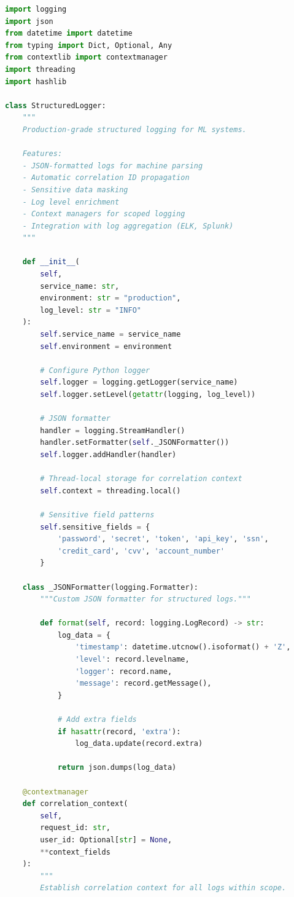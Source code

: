 \begin{lstlisting}[language=Python, caption={Production StructuredLogger with Metadata Enrichment}]
import logging
import json
from datetime import datetime
from typing import Dict, Optional, Any
from contextlib import contextmanager
import threading
import hashlib

class StructuredLogger:
    """
    Production-grade structured logging for ML systems.

    Features:
    - JSON-formatted logs for machine parsing
    - Automatic correlation ID propagation
    - Sensitive data masking
    - Log level enrichment
    - Context managers for scoped logging
    - Integration with log aggregation (ELK, Splunk)
    """

    def __init__(
        self,
        service_name: str,
        environment: str = "production",
        log_level: str = "INFO"
    ):
        self.service_name = service_name
        self.environment = environment

        # Configure Python logger
        self.logger = logging.getLogger(service_name)
        self.logger.setLevel(getattr(logging, log_level))

        # JSON formatter
        handler = logging.StreamHandler()
        handler.setFormatter(self._JSONFormatter())
        self.logger.addHandler(handler)

        # Thread-local storage for correlation context
        self.context = threading.local()

        # Sensitive field patterns
        self.sensitive_fields = {
            'password', 'secret', 'token', 'api_key', 'ssn',
            'credit_card', 'cvv', 'account_number'
        }

    class _JSONFormatter(logging.Formatter):
        """Custom JSON formatter for structured logs."""

        def format(self, record: logging.LogRecord) -> str:
            log_data = {
                'timestamp': datetime.utcnow().isoformat() + 'Z',
                'level': record.levelname,
                'logger': record.name,
                'message': record.getMessage(),
            }

            # Add extra fields
            if hasattr(record, 'extra'):
                log_data.update(record.extra)

            return json.dumps(log_data)

    @contextmanager
    def correlation_context(
        self,
        request_id: str,
        user_id: Optional[str] = None,
        **context_fields
    ):
        """
        Establish correlation context for all logs within scope.


\end{lstlisting}
